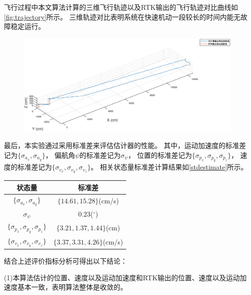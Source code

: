 \documentclass[
  type=master
]{gdutthesis}
\begin{document}
飞行过程中本文算法计算的三维飞行轨迹以及RTK输出的飞行轨迹对比曲线如\autoref{fig:trajectory}所示。
三维轨迹对比表明系统在快速机动一段较长的时间内能无故障稳定运行。
\begin{figure}[H]
	\centering
	\includegraphics[width=1.0\textwidth]{trajectory2.eps}
	\label{fig:trajectory}
\end{figure}

最后，本实验通过采用标准差来评估估计器的性能。
其中，运动加速度的标准差记为$\big\{ \sigma_{a_x},\sigma_{a_y} \big\}$，
偏航角$\psi$的标准差记为$\sigma_{\psi}$，
位置的标准差记为$\big\{ \sigma_{p_x},\sigma_{p_y},\sigma_{p_z} \big\}$，
速度的标准差记为$\big\{ \sigma_{v_x},\sigma_{v_y},\sigma_{v_z} \big\}$。
相关状态量标准差计算结果如\autoref{stdestimate}所示。
\begin{table}[H]
	\label{stdestimate}
	\begin{tabular}{cc}
		\toprule
		状态量 & 标准差 \\
		\midrule
		$\big\{ \sigma_{a_x},\sigma_{a_y} \big\}$ & $\big\{ 14.61, 15.28 \big\}$(cm/s) \\
		$\sigma_{\psi}$ & $0.23$($^{\circ}$)   \\
		$\big\{ \sigma_{p_x},\sigma_{p_y},\sigma_{p_z} \big\}$ & $\big\{ 3.21, 1.37, 1.44 \big\}$(cm)   \\
		$\big\{ \sigma_{v_x},\sigma_{v_y},\sigma_{v_z} \big\}$ & $\big\{ 3.37, 3.31, 4.26 \big\}$(cm/s)   \\
		\bottomrule
	\end{tabular}
\end{table}

结合上述评价指标分析可得出以下结论：

(1)本算法估计的位置、速度以及运动加速度和RTK输出的位置、速度以及运动加速度基本一致，表明算法整体是收敛的。
\end{document}
